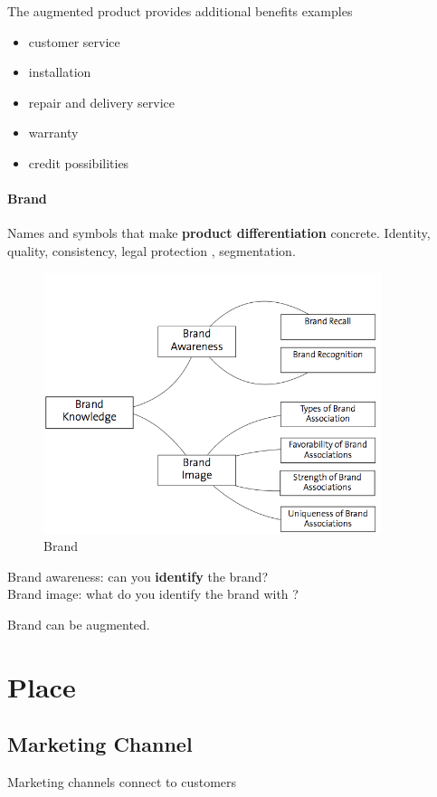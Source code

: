 \documentclass[a4paper,titlepage] {scrartcl}
\begin{document}
The augmented product provides additional benefits
examples
\begin{itemize}
	\item customer service
	\item installation
	\item repair and delivery service
	\item warranty
	\item credit possibilities
\end{itemize}


\paragraph{Brand} %
\label{par:brand}
Names and symbols that make \textbf{product differentiation} concrete. Identity, quality, consistency, legal protection , segmentation.
\begin{figure}[htbp]
	\centering
		\includegraphics[height=3in]{images/brand.png}
	\caption{Brand}
	\label{fig:images_brand}
\end{figure}

Brand awareness: can you \textbf{identify} the brand?\\
Brand image: what do you identify the brand with ?

Brand can be augmented.


\section{Place} %
\label{sub:product}

\subsection{Marketing Channel}
Marketing channels connect to customers
\end{document}
